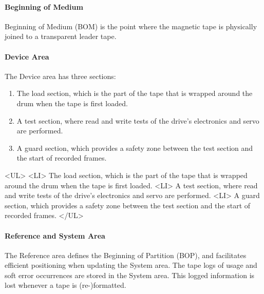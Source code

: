 \documentclass[11pt]{article}
\newenvironment{latexonly}{}{}
\begin{document}
\paragraph {Beginning of Medium}

Beginning of Medium (BOM) is the point where the magnetic tape is physically
joined to a transparent leader tape.

\paragraph {Device Area}

The Device area has three sections:

\begin {latexonly}

\begin {enumerate}
\renewcommand{\theenumi}{\alph{enumi}}

\item The load section, which is the part of the tape
that is wrapped around the drum when the tape is first loaded.

\item A test section, where read and write tests of the
drive's electronics and servo are performed.

\item A guard section, which provides a safety zone
between the test section and the start of recorded frames.

\end {enumerate}

\end {latexonly}

\begin{htmlonly}
\begin{rawhtml}
<UL>
<LI> The load section, which is the part of the tape that is wrapped around
the drum when the tape is first loaded.
<LI> A test section, where read and write tests of the drive's electronics
and servo are performed.
<LI> A guard section, which provides a safety zone between the test section
and the start of recorded frames.
</UL>
\end{rawhtml}
\end{htmlonly}

\paragraph {Reference and System Area}

The Reference area defines the Beginning of Partition (BOP), and facilitates
efficient positioning when updating the System area. The tape logs of usage
and soft error occurrences are stored in the System area. This logged
information is lost whenever a tape is (re-)formatted.
\end{document}
